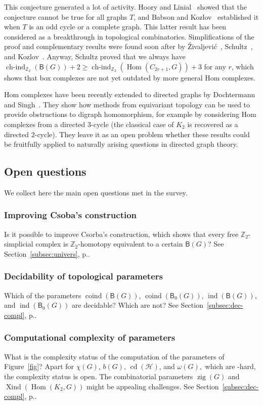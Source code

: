 \documentclass[12pt]{amsart}
\theoremstyle{definition}
\def\Z{\mathbb{Z}}
\def\HH{\mathcal{H}}
\def\B{\mathsf{B}}
\renewcommand{\geq}{\geqslant}
\def\Hom{\operatorname{Hom}}
\def\coind{\operatorname{coind}}
\def\ind{\operatorname{ind}}
\def\hind{\operatorname{ch-ind}_{\Z_2}}
\def\Xind{\operatorname{Xind}}
\def\cd{\operatorname{cd}}
\def\zig{\operatorname{zig}}
\begin{document}
This conjecture generated a lot of activity. Hoory and Linial~\cite{hoory2005counterexample} showed that the conjecture cannot be true for all graphs $T$, and Babson and Kozlov~\cite{babson2007proof} established it when $T$ is an odd cycle or a complete graph. This latter result has been considered as a breakthrough in topological combinatorics. Simplifications of the proof and complementary results were found soon after by {\v Z}ivaljevi\'c~\cite{zivaljevic2005parallel}, Schultz~\cite{schultz2009graph}, and Kozlov~\cite{kozlov2006cobounding}. Anyway, Schultz proved that we always have $\hind(\B(G))+2 \geq \hind(\Hom(C_{2r+1},G))+3$ for any $r$, which shows that box complexes are not yet outdated by more general Hom complexes.

Hom complexes have been recently extended to directed graphs by Dochtermann and Singh~\cite{dochtermann2023homomorphism}. They show how methods from equivariant topology can be used to provide obstructions to digraph homomorphism, for example by considering Hom complexes from a directed 3-cycle (the classical case of $K_2$ is recovered as a directed $2$-cycle). They leave it as an open problem whether these results could be fruitfully applied to naturally arising questions in directed graph theory.

\subsection{Open questions}\label{subsec:open} We collect here the main open questions met in the survey.

\subsubsection*{Improving Csoba's construction} Is it possible to improve Csorba's construction, which shows that every free $\Z_2$-simplicial complex is $\Z_2$-homotopy equivalent to a certain $\B(G)$? See Section~\ref{subsec:univers}, p.\pageref{page:csorba}.

\subsubsection*{Decidability of topological parameters} Which of the parameters $\coind(\B(G))$, $\coind(\B_0(G))$, $\ind(\B(G))$, and $\ind(\B_0(G))$ are decidable? Which are not?
See Section~\ref{subsec:dec-compl}, p.\pageref{page:dec}.

\subsubsection*{Computational complexity of parameters}
 What is the complexity status of the computation of the parameters of Figure~\ref{fig}? Apart for $\chi(G)$, $b(G)$, $\cd(\HH)$, and $\omega(G),$ which are \NP-hard, the complexity status is open. The combinatorial parameters $\zig(G)$ and $\Xind(\Hom(K_2,G))$ might be appealing challenges. See Section~\ref{subsec:dec-compl}, p.\pageref{page:compl}.
\end{document}

